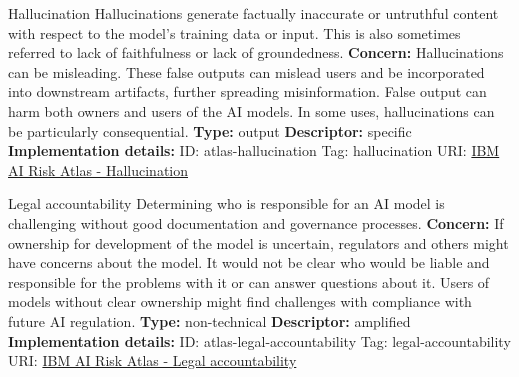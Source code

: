 \documentclass[a4paper,12pt]{article}
\begin{document}
\begin{definitionbox}{Hallucination}
Hallucinations generate factually inaccurate or untruthful content with respect to the model's training data or input. This is also sometimes referred to lack of faithfulness or lack of groundedness.\newline\newline
\textbf{Concern: }Hallucinations can be misleading. These false outputs can mislead users and be incorporated into downstream artifacts, further spreading misinformation. False output can harm both owners and users of the AI models. In some uses, hallucinations can be particularly consequential.\newline\newline
\textbf{Type: }output\newline
\textbf{Descriptor: }specific \newline\newline
\textbf{Implementation details: } \newline
ID: atlas-hallucination \newline
Tag: hallucination \newline
URI:  \href{https://www.ibm.com/docs/en/watsonx/saas?topic=SSYOK8/wsj/ai-risk-atlas/hallucination.html}{IBM AI Risk Atlas - Hallucination}\newline
\end{definitionbox}
\begin{definitionbox}{Legal accountability}
Determining who is responsible for an AI model is challenging without good documentation and governance processes.\newline\newline
\textbf{Concern: }If ownership for development of the model is uncertain, regulators and others might have concerns about the model. It would not be clear who would be liable and responsible for the problems with it or can answer questions about it. Users of models without clear ownership might find challenges with compliance with future AI regulation.\newline\newline
\textbf{Type: }non-technical\newline
\textbf{Descriptor: }amplified \newline\newline
\textbf{Implementation details: } \newline
ID: atlas-legal-accountability \newline
Tag: legal-accountability \newline
URI:  \href{https://www.ibm.com/docs/en/watsonx/saas?topic=SSYOK8/wsj/ai-risk-atlas/legal-accountability.html}{IBM AI Risk Atlas - Legal accountability}\newline
\end{definitionbox}
\end{document}
